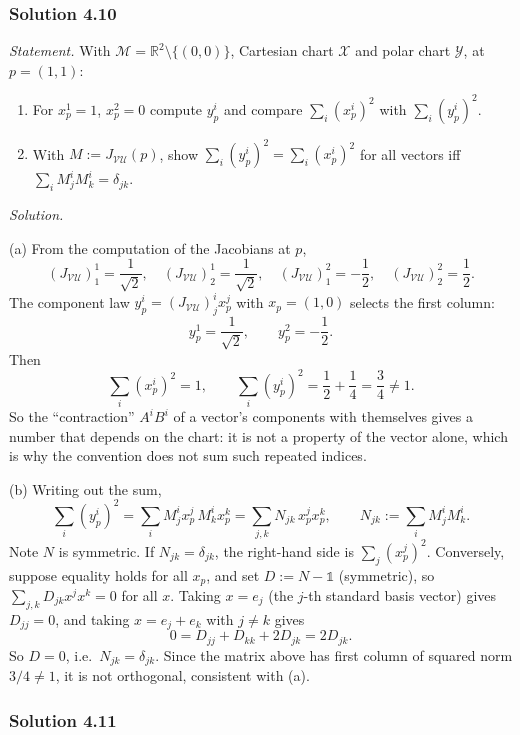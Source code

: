 \documentclass[11pt]{article}
\begin{document}
\subsubsection*{Solution 4.10}

\noindent\textit{Statement.} With $\mathcal M=\mathbb R^2\setminus\{(0,0)\}$,
Cartesian chart $\mathcal X$ and polar chart $\mathcal Y$, at $p=(1,1)$:
\begin{enumerate}[label=(\alph*)]
  \item For $x^1_p=1$, $x^2_p=0$ compute $y^i_p$ and compare
  $\sum_i(x^i_p)^2$ with $\sum_i(y^i_p)^2$.
  \item With $M:=J_{\mathcal{VU}}(p)$, show $\sum_i(y^i_p)^2=\sum_i(x^i_p)^2$
  for all vectors iff $\sum_iM^i_jM^i_k=\delta_{jk}$.
\end{enumerate}

\medskip
\noindent\textit{Solution.}

(a) From the computation of the Jacobians at $p$,
\[
(J_{\mathcal{VU}})^1_1=\frac1{\sqrt2},\quad
(J_{\mathcal{VU}})^1_2=\frac1{\sqrt2},\quad
(J_{\mathcal{VU}})^2_1=-\frac12,\quad
(J_{\mathcal{VU}})^2_2=\frac12.
\]
The component law $y^i_p=(J_{\mathcal{VU}})^i_jx^j_p$ with $x_p=(1,0)$
selects the first column:
\[
y^1_p=\frac1{\sqrt2},\qquad y^2_p=-\frac12.
\]
Then
\[
\sum_i(x^i_p)^2=1,\qquad
\sum_i(y^i_p)^2=\frac12+\frac14=\frac34\neq1.
\]
So the ``contraction'' $A^iB^i$ of a vector's components with themselves
gives a number that depends on the chart: it is not a property of the
vector alone, which is why the convention does not sum such repeated
indices.

(b) Writing out the sum,
\[
\sum_i(y^i_p)^2=\sum_i M^i_jx^j_p\,M^i_kx^k_p=\sum_{j,k}N_{jk}\,x^j_px^k_p,
\qquad N_{jk}:=\sum_iM^i_jM^i_k.
\]
Note $N$ is symmetric. If $N_{jk}=\delta_{jk}$, the right-hand side is
$\sum_j(x^j_p)^2$. Conversely, suppose equality holds for all $x_p$, and set
$D:=N-\mathbb 1$ (symmetric), so $\sum_{j,k}D_{jk}x^jx^k=0$ for all $x$.
Taking $x=e_j$ (the $j$-th standard basis vector) gives $D_{jj}=0$, and
taking $x=e_j+e_k$ with $j\neq k$ gives
\[
0=D_{jj}+D_{kk}+2D_{jk}=2D_{jk}.
\]
So $D=0$, i.e.\ $N_{jk}=\delta_{jk}$. Since the matrix above has first
column of squared norm $3/4\neq1$, it is not orthogonal, consistent with
(a).

\subsubsection*{Solution 4.11}
\end{document}
